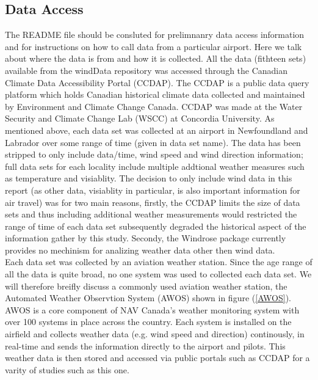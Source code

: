 \documentclass{article}
\begin{document}
\subsection{Data Access}\label{Data_access}
The README file should be consluted for prelimnanry data access information and for instructions on how to call data from a particular airport. Here we talk about where the data is from and how it is 
collected. All the data (fithteen sets) available from the windData repository was accessed through the Canadian Climate Data Accessibility Portal (CCDAP). The CCDAP is a public data query platform which 
holds Canadian historical climate data collected and maintained by Environment and Climate Change Canada. CCDAP was made at the Water Security and Climate Change Lab (WSCC) at Concordia University. As 
mentioned above, each data set was collected at an airport in Newfoundland and Labrador over some range of time (given in data set name). The data has been stripped to only include data/time, wind speed 
and wind direction information; full data sets for each locality include multiple addtional weather measures such as temperature and visiablity. The decision to only include wind data in this report (as 
other data, visiablity in particular, is also important information for air travel) was for two main reasons, firstly, the CCDAP limits the size of data sets and thus including additional weather 
measurements would restricted the range of time of each data set subsequently degraded the historical aspect of the information gather by this study. Secondy, the Windrose package currently provides no 
mechinism for analizing weather data other then wind data.
\\
\indent Each data set was collected by an aviation weather station. Since the age range of all the data is quite broad, no one system was used to collected each data set. We will therefore breifly 
discuss a commonly used aviation weather station, the Automated Weather Observtion System (AWOS) shown in figure (\ref{AWOS}). AWOS is a core component of NAV Canada's weather monitoring system with over 
100 systems in place across the country. Each system is installed on the airfield and collects weather data (e.g. wind speed and direction) continously, in real-time and sends the information directly 
to the airport and pilots. This weather data is then stored and accessed via public portals such as CCDAP for a varity of studies such as this one. 
\end{document}
